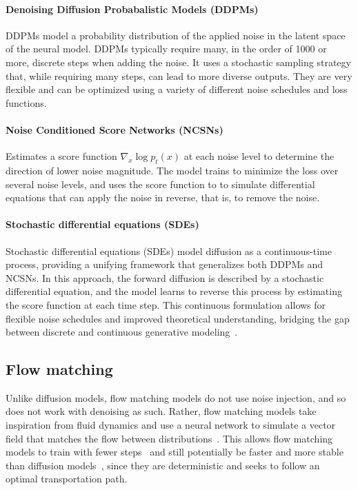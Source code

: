 \documentclass{article}
\begin{document}
\paragraph{Denoising Diffusion Probabalistic Models (DDPMs)} 
DDPMs model a probability distribution of the applied noise in the latent space of the neural model. DDPMs typically require many, in the order of 1000 or more, discrete steps when adding the noise. It uses a stochastic sampling strategy that, while requiring many steps, can lead to more diverse outputs. They are very flexible and can be optimized using a variety of different noise schedules and loss functions.

\paragraph{Noise Conditioned Score Networks (NCSNs)} 
Estimates a score function $\nabla_x \log p_t(x)$ at each noise level to determine the direction of lower noise magnitude. The model trains to minimize the loss over several noise levels, and uses the score function to to simulate differential equations that can apply the noise in reverse, that is, to remove the noise.

\paragraph{Stochastic differential equations (SDEs)} 
Stochastic differential equations (SDEs) model diffusion as a continuous-time process, providing a unifying framework that generalizes both DDPMs and NCSNs. In this approach, the forward diffusion is described by a stochastic differential equation, and the model learns to reverse this process by estimating the score function at each time step. This continuous formulation allows for flexible noise schedules and improved theoretical understanding, bridging the gap between discrete and continuous generative modeling~\cite{song2020score}.


\subsection{Flow matching}

Unlike diffusion models, flow matching models do not use noise injection, and so does not work with denoising as such. Rather, flow matching models take inspiration from fluid dynamics and use a neural network to simulate a vector field that matches the flow between distributions~\cite{holderrieth2025introduction}. This allows flow matching models to train with fewer steps~\cite{kornilov2024optimal} and still potentially be faster and more stable than diffusion models~\cite{lipman2022flow}, since they are deterministic and seeks to follow an optimal transportation path. 
\end{document}
